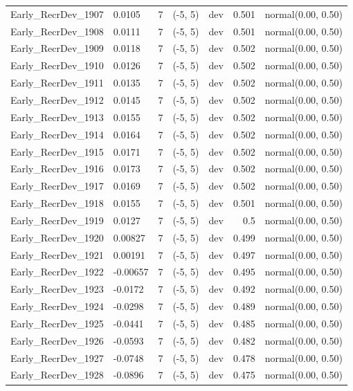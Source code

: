 \documentclass[
  english,
]{article}
\begin{document}
\begin{landscape}
\begin{longtable}{llrllrl}
Early\_RecrDev\_1907 & 0.0105 & 7 & (-5, 5) & dev & 0.501 & normal(0.00, 0.50) \\ 
Early\_RecrDev\_1908 & 0.0111 & 7 & (-5, 5) & dev & 0.501 & normal(0.00, 0.50) \\ 
Early\_RecrDev\_1909 & 0.0118 & 7 & (-5, 5) & dev & 0.502 & normal(0.00, 0.50) \\ 
Early\_RecrDev\_1910 & 0.0126 & 7 & (-5, 5) & dev & 0.502 & normal(0.00, 0.50) \\ 
Early\_RecrDev\_1911 & 0.0135 & 7 & (-5, 5) & dev & 0.502 & normal(0.00, 0.50) \\ 
Early\_RecrDev\_1912 & 0.0145 & 7 & (-5, 5) & dev & 0.502 & normal(0.00, 0.50) \\ 
Early\_RecrDev\_1913 & 0.0155 & 7 & (-5, 5) & dev & 0.502 & normal(0.00, 0.50) \\ 
Early\_RecrDev\_1914 & 0.0164 & 7 & (-5, 5) & dev & 0.502 & normal(0.00, 0.50) \\ 
Early\_RecrDev\_1915 & 0.0171 & 7 & (-5, 5) & dev & 0.502 & normal(0.00, 0.50) \\ 
Early\_RecrDev\_1916 & 0.0173 & 7 & (-5, 5) & dev & 0.502 & normal(0.00, 0.50) \\ 
Early\_RecrDev\_1917 & 0.0169 & 7 & (-5, 5) & dev & 0.502 & normal(0.00, 0.50) \\ 
Early\_RecrDev\_1918 & 0.0155 & 7 & (-5, 5) & dev & 0.501 & normal(0.00, 0.50) \\ 
Early\_RecrDev\_1919 & 0.0127 & 7 & (-5, 5) & dev & 0.5 & normal(0.00, 0.50) \\ 
Early\_RecrDev\_1920 & 0.00827 & 7 & (-5, 5) & dev & 0.499 & normal(0.00, 0.50) \\ 
Early\_RecrDev\_1921 & 0.00191 & 7 & (-5, 5) & dev & 0.497 & normal(0.00, 0.50) \\ 
Early\_RecrDev\_1922 & -0.00657 & 7 & (-5, 5) & dev & 0.495 & normal(0.00, 0.50) \\ 
Early\_RecrDev\_1923 & -0.0172 & 7 & (-5, 5) & dev & 0.492 & normal(0.00, 0.50) \\ 
Early\_RecrDev\_1924 & -0.0298 & 7 & (-5, 5) & dev & 0.489 & normal(0.00, 0.50) \\ 
Early\_RecrDev\_1925 & -0.0441 & 7 & (-5, 5) & dev & 0.485 & normal(0.00, 0.50) \\ 
Early\_RecrDev\_1926 & -0.0593 & 7 & (-5, 5) & dev & 0.482 & normal(0.00, 0.50) \\ 
Early\_RecrDev\_1927 & -0.0748 & 7 & (-5, 5) & dev & 0.478 & normal(0.00, 0.50) \\ 
Early\_RecrDev\_1928 & -0.0896 & 7 & (-5, 5) & dev & 0.475 & normal(0.00, 0.50) \\ 

\end{longtable}
\end{landscape}
\end{document}
